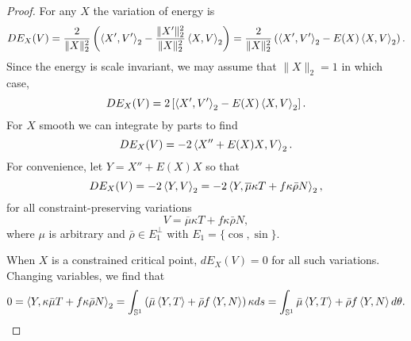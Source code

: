 \begin{proof}
For any \(X\) the variation of energy is
\[
DE_X (V) = \frac{2}{\|X\|_2^2} \left(\left\langle{X'},{V'}\right\rangle_2 - \frac{\|X'\|_2^2}{\|X\|_2^2}\left\langle{X},{V}\right\rangle_2\right) = \frac{2}{\|X\|_2^2} \left(\left\langle{X'},{V'}\right\rangle_2 - E(X) \left\langle{X},{V}\right\rangle_2\right).
\]
Since the energy is scale invariant, we may assume that \(\|X\|_2 = 1\) in which case,
\[
DE_X (V) = 2\left[\left\langle{X'},{V'}\right\rangle_2 - E(X) \left\langle{X},{V}\right\rangle_2\right].
\]
For \(X\) smooth we can integrate by parts to find
\[
DE_X(V) = -2\left\langle{X'' + E(X) X},{V}\right\rangle_2.
\]
For convenience, let \(Y = X'' + E(X) X\) so that
\[
DE_X(V) = -2\left\langle{Y},{V}\right\rangle_2=-2\left\langle{Y},{{\overline{\mu}}\kappa T + f\kappa\bar{\rho} N}\right\rangle_2,
\]
for all constraint-preserving variations $$V = {\overline{\mu}}\kappa T + f\kappa\bar{\rho} N,$$
where \({\mu}\) is arbitrary and \(\bar{\rho} \in E_1^{\perp}\) with \(E_1 = \{\cos,\sin\}\).


When \(X\) is a constrained critical point, $dE_X(V)=0$ for all such variations.  Changing variables, we find that 
\begin{equation}
0 = \left\langle{Y},{\kappa \bar{\mu} T + f\kappa\bar{\rho} N}\right\rangle_2 = \int_{\operatorname{\mathbb{S}^1}} \left(\bar{\mu} \left\langle{Y},{T}\right\rangle + \bar{\rho}f \left\langle{Y},{N}\right\rangle\right) \kappa ds = \int_{\operatorname{\mathbb{S}^1}} \bar{\mu} \left\langle{Y},{T}\right\rangle +\bar{\rho}f \left\langle{Y},{N}\right\rangle d\theta.  \label{eq:constrained_critical_theta}
\end{equation}


\end{proof}
